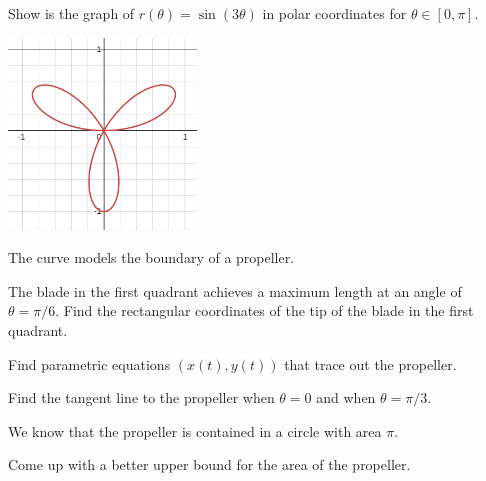 \documentclass{workbook}
\begin{document}
\begin{slide}
	\question

		Show is the graph of $\displaystyle
		r(\theta)=\sin(3\theta)
		$
		in polar coordinates
		for $\theta\in[0,\pi]$.
		\begin{center}
	\includegraphics[height=2in]{images/parametric2.png}
		\end{center}

	
	The curve models the boundary of a propeller.

	\begin{parts}
		\item The blade in the first quadrant achieves a maximum length at 
		an angle of $\theta =\pi/6$. Find the rectangular coordinates of
		the tip of the blade in the first quadrant.

		\item Find parametric equations $(x(t), y(t))$ that trace out the 
		propeller.

		\item Find the tangent line to the propeller when $\theta=0$
		and when $\theta =\pi/3$.

		\item We know that the propeller is contained in 
		a circle with area $\pi$.

		Come up with a better upper bound for the area of the 
		propeller.		
	\end{parts}
\end{slide}
\end{document}
